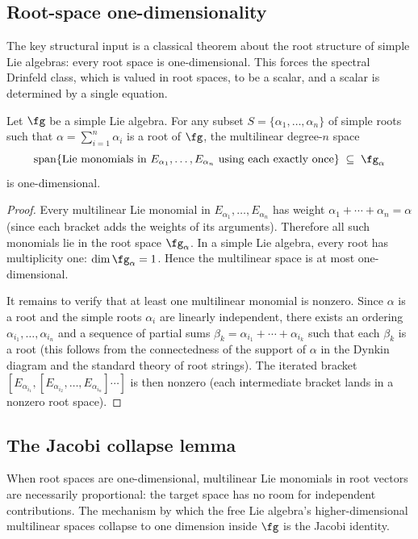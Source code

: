\subsection{Root-space one-dimensionality}

The key structural input is a classical theorem about the root
structure of simple Lie algebras: every root space is one-dimensional.
This forces the spectral Drinfeld class, which is valued in root
spaces, to be a scalar, and a scalar is determined by a single
equation.

\begin{theorem}
\label{thm:root-space-one-dim-v1}
Let $\fg$ be a simple Lie algebra. For any subset
$S=\{\alpha_1,\ldots,\alpha_n\}$ of simple roots such that
$\alpha=\sum_{i=1}^n\alpha_i$ is a root of $\fg$, the multilinear
degree-$n$ space
\[
\operatorname{span}\{\textup{Lie monomials in }E_{\alpha_1},\ldots,
E_{\alpha_n}\textup{ using each exactly once}\}\;\subseteq\;\fg_\alpha
\]
is one-dimensional.
\end{theorem}

\begin{proof}
Every multilinear Lie monomial in $E_{\alpha_1},\ldots,E_{\alpha_n}$
has weight $\alpha_1+\cdots+\alpha_n=\alpha$ (since each bracket
adds the weights of its arguments). Therefore all such monomials
lie in the root space $\fg_\alpha$. In a simple Lie algebra, every
root has multiplicity one: $\dim\fg_\alpha=1$. Hence the
multilinear space is at most one-dimensional.

It remains to verify that at least one multilinear monomial is
nonzero. Since $\alpha$ is a root and the simple roots $\alpha_i$ are
linearly independent, there exists an ordering
$\alpha_{i_1},\ldots,\alpha_{i_n}$ and a sequence of partial sums
$\beta_k=\alpha_{i_1}+\cdots+\alpha_{i_k}$ such that each $\beta_k$
is a root (this follows from the connectedness of the support of
$\alpha$ in the Dynkin diagram and the standard theory of root
strings). The iterated bracket
$[E_{\alpha_{i_1}},[E_{\alpha_{i_2}},\ldots,E_{\alpha_{i_n}}]\cdots]$
is then nonzero (each intermediate bracket lands in a nonzero root
space).
\end{proof}

\subsection{The Jacobi collapse lemma}

When root spaces are one-dimensional, multilinear Lie monomials
in root vectors are necessarily proportional: the target space
has no room for independent contributions. The mechanism by
which the free Lie algebra's higher-dimensional multilinear spaces
collapse to one dimension inside $\fg$ is the Jacobi identity.

